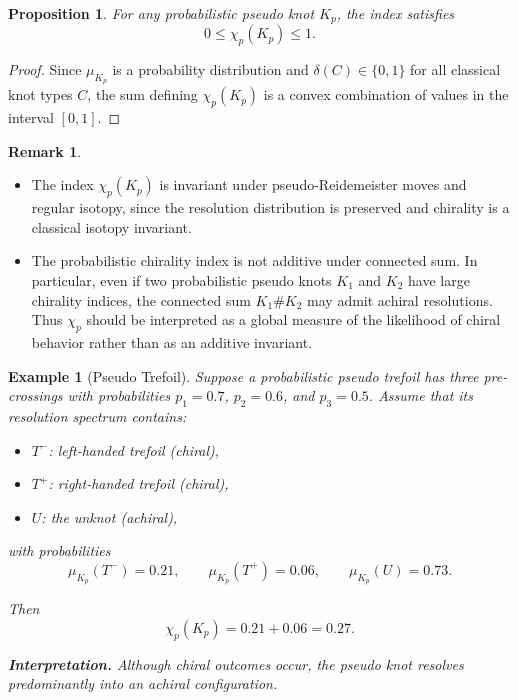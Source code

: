 \documentclass[a4paper, reqno, 12pt]{amsart}
\theoremstyle{plain}
\newtheorem{proposition}[theorem]{Proposition}
\newtheorem{ex}[theorem]{Example}
\theoremstyle{definition}
\newtheorem{remark}[theorem]{Remark}
\begin{document}
\begin{proposition}
For any probabilistic pseudo knot \( K_p \), the index satisfies
\[
0 \leq \chi_p(K_p) \leq 1 .
\]
\end{proposition}

\begin{proof}
Since \( \mu_{K_p} \) is a probability distribution and \( \delta(C)\in\{0,1\} \) for all classical knot types \( C \), the sum defining \( \chi_p(K_p) \) is a convex combination of values in the interval \( [0,1] \).
\end{proof}



\begin{remark}\rm
\begin{itemize}
\item[(i)] The index \( \chi_p(K_p) \) is invariant under pseudo-Reidemeister moves and regular isotopy, since the resolution distribution is preserved and chirality is a classical isotopy invariant.

\smallbreak

\item[(ii)] The probabilistic chirality index is not additive under connected sum. In particular, even if two probabilistic pseudo knots \( K_1 \) and \( K_2 \) have large chirality indices, the connected sum \( K_1 \# K_2 \) may admit achiral resolutions. Thus \( \chi_p \) should be interpreted as a global measure of the likelihood of chiral behavior rather than as an additive invariant.
\end{itemize}
\end{remark}



\begin{ex}[Pseudo Trefoil]\label{pptchind}\rm
Suppose a probabilistic pseudo trefoil has three pre-crossings with probabilities \( p_1 = 0.7 \), \( p_2 = 0.6 \), and \( p_3 = 0.5 \). Assume that its resolution spectrum contains:
\begin{itemize}
\item[] \( T^- \): left-handed trefoil (chiral),
\item[] \( T^+ \): right-handed trefoil (chiral),
\item[] \( U \): the unknot (achiral),
\end{itemize}
with probabilities
\[
\mu_{K_p}(T^-) = 0.21,
\qquad
\mu_{K_p}(T^+) = 0.06,
\qquad
\mu_{K_p}(U) = 0.73 .
\]

Then
\[
\chi_p(K_p)
=
0.21 + 0.06
=
0.27 .
\]

\noindent
\textbf{Interpretation.}
Although chiral outcomes occur, the pseudo knot resolves predominantly into an achiral configuration.
\end{ex}
\end{document}
